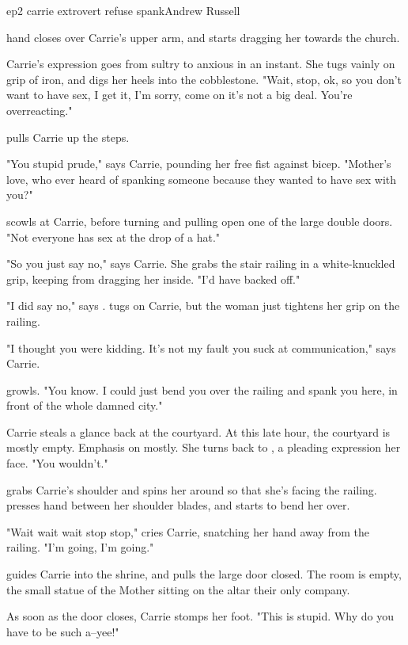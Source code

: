 \documentclass{book}
\begin{document}
\begin{childnode}{ep2 carrie extrovert refuse spank}{Andrew Russell}

    \names{} hand closes over Carrie's upper arm, and \heshe{} starts dragging her towards the church.

    Carrie's expression goes from sultry to anxious in an instant. She tugs vainly on \names{} grip of iron, and digs her heels into the cobblestone. "Wait, stop, ok, so you don't want to have sex, I get it, I'm sorry, come on it's not a big deal. You're overreacting."

    \name{} pulls Carrie up the steps.

    "You stupid prude," says Carrie, pounding her free fist against \names{} bicep. "Mother's love, who ever heard of spanking someone because they wanted to have sex with you?"

    \name{} scowls at Carrie, before turning and pulling open one of the large double doors. "Not everyone has sex at the drop of a hat."

    "So you just say no," says Carrie. She grabs the stair railing in a white-knuckled grip, keeping \name{} from dragging her inside. "I'd have backed off." 

    "I did say no," says \name{}. \HeShe{} tugs on Carrie, but the woman just tightens her grip on the railing.

    "I thought you were kidding. It's not my fault you suck at communication," says Carrie.

    \name{} growls. "You know. I could just bend you over the railing and spank you here, in front of the whole damned city."

    Carrie steals a glance back at the courtyard. At this late hour, the courtyard is mostly empty. Emphasis on mostly. She turns back to \name{}, a pleading expression her face. "You wouldn't."

    \name{} grabs Carrie's shoulder and spins her around so that she's facing the railing. \HeShe{} presses \hisher{} hand between her shoulder blades, and starts to bend her over. 

    "Wait wait wait stop stop," cries Carrie, snatching her hand away from the railing. "I'm going, I'm going." 

    \name{} guides Carrie into the shrine, and pulls the large door closed. The room is empty, the small statue of the Mother sitting on the altar their only company.

    As soon as the door closes, Carrie stomps her foot. "This is stupid. Why do you have to be such a--yee!"


\end{childnode}
\end{document}
